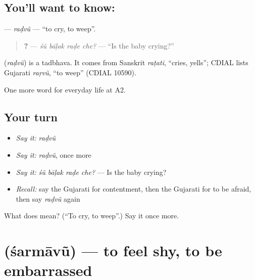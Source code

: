 \subsection*{You'll want to know: }
\textbf{} — \emph{raḍvũ} — \textquotedblleft{}to cry, to weep\textquotedblright{}.

\begin{quote}
\textbf{   ?} — \emph{śũ bāḷak raḍe che?} — \textquotedblleft{}Is the baby crying?\textquotedblright{}
\end{quote}

\begin{cousinweb}
\textbf{} (\emph{raḍvũ}) is a tadbhava. It comes from Sanskrit \emph{raṭati}, \textquotedblleft{}cries, yells\textquotedblright{}; CDIAL lists Gujarati \emph{raṛvũ}, \textquotedblleft{}to weep\textquotedblright{} (CDIAL 10590).
\end{cousinweb}

\begin{grammarlens}[title={What you've built}]
One more word for everyday life at A2.
\end{grammarlens}

\subsection*{Your turn}
\begin{itemize}
\raggedright
  \item \emph{Say it:} \emph{raḍvũ}
  \item \emph{Say it:} \emph{raḍvũ}, once more
  \item \emph{Say it:} \emph{śũ bāḷak raḍe che?} — Is the baby crying?
  \item \emph{Recall:} say the Gujarati for contentment, then the Gujarati for to be afraid, then say \emph{raḍvũ} again
\end{itemize}

\begin{tcolorbox}[breakable,colback=teal!4,colframe=teal!35!black,title={Before you move on}]
What does  mean? (\textquotedblleft{}To cry, to weep\textquotedblright{}.) Say it once more.
\end{tcolorbox}
\section[\texorpdfstring{\gu{શરમાવું} (śarmāvũ)}{શરમાવું (śarmāvũ)}]{ (śarmāvũ) — to feel shy, to be embarrassed}

